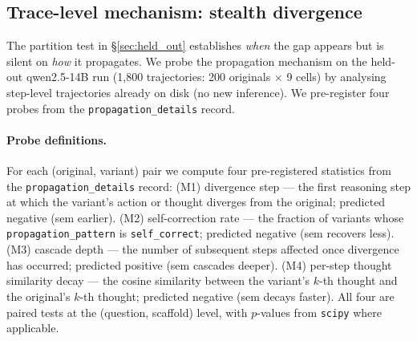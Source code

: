 \documentclass[11pt]{article}
\begin{document}
\subsection{Trace-level mechanism: stealth divergence}
\label{sec:mechanism}

The partition test in \S\ref{sec:held_out} establishes \emph{when} the gap appears but is silent on \emph{how} it propagates. We probe the propagation mechanism on the held-out qwen2.5-14B run (1{,}800 trajectories: 200 originals $\times$ 9 cells) by analysing step-level trajectories already on disk (no new inference). We pre-register four probes from the \texttt{propagation\_details} record.

\paragraph{Probe definitions.} For each (original, variant) pair we compute four pre-registered statistics from the \texttt{propagation\_details} record: (M1) divergence step --- the first reasoning step at which the variant's action or thought diverges from the original; predicted negative (sem earlier). (M2) self-correction rate --- the fraction of variants whose \texttt{propagation\_pattern} is \texttt{self\_correct}; predicted negative (sem recovers less). (M3) cascade depth --- the number of subsequent steps affected once divergence has occurred; predicted positive (sem cascades deeper). (M4) per-step thought similarity decay --- the cosine similarity between the variant's $k$-th thought and the original's $k$-th thought; predicted negative (sem decays faster). All four are paired tests at the (question, scaffold) level, with $p$-values from \texttt{scipy} where applicable.
\end{document}
